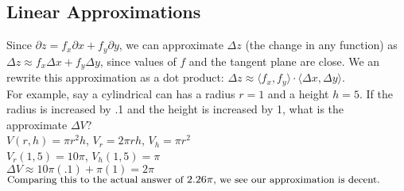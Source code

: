 \subsection{Linear Approximations}
\noindent
Since $\partial z=f_x\partial x + f_y\partial y$, we can approximate $\Delta z$ (the change in any function) as $\Delta z \approx f_x\Delta x+f_y\Delta y$, since values of $f$ and the tangent plane are close. We an rewrite this approximation as a dot product: $\Delta z \approx \langle f_x, f_y\rangle\cdot\langle \Delta x, \Delta y\rangle$.\\
For example, say a cylindrical can has a radius $r=1$ and a height $h=5$. If the radius is increased by .1 and the height is increased by 1, what is the approximate $\Delta V$?\\
\indent
$V(r,h)=\pi r^2 h$, $V_r=2\pi rh$, $V_h=\pi r^2$\\
\indent
$V_{r}(1,5)=10\pi$, $V_{h}(1,5)=\pi$\\
\indent
$\Delta V\approx 10\pi(.1)+\pi(1)=2\pi$\\
\indent
$\small{\text{Comparing this to the actual answer of }2.26\pi\text{, we see our approximation is decent.}}$